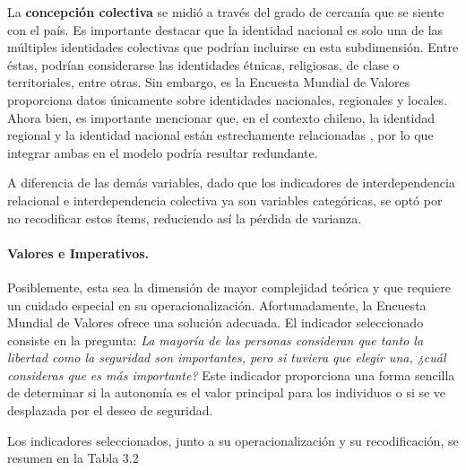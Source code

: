 \documentclass[12pt,twoside]{templates/facsothesis}
\begin{document}
La \textbf{concepción colectiva} se midió a través del grado de cercanía que se siente con el país. Es importante destacar que la identidad nacional es solo una de las múltiples identidades colectivas que podrían incluirse en esta subdimensión. Entre éstas, podrían considerarse las identidades étnicas, religiosas, de clase o territoriales, entre otras. Sin embargo, es la Encuesta Mundial de Valores proporciona datos únicamente sobre identidades nacionales, regionales y locales. Ahora bien, es importante mencionar que, en el contexto chileno, la identidad regional y la identidad nacional están estrechamente relacionadas \citep{zuniga2010}, por lo que integrar ambas en el modelo podría resultar redundante.

A diferencia de las demás variables, dado que los indicadores de interdependencia relacional e interdependencia colectiva ya son variables categóricas, se optó por no recodificar estos ítems, reduciendo así la pérdida de varianza.

\hypertarget{valores-e-imperativos.}{%
\paragraph*{Valores e Imperativos.}\label{valores-e-imperativos.}}

Posiblemente, esta sea la dimensión de mayor complejidad teórica y que requiere un cuidado especial en su operacionalización. Afortunadamente, la Encuesta Mundial de Valores ofrece una solución adecuada. El indicador seleccionado consiste en la pregunta: \emph{La mayoría de las personas consideran que tanto la libertad como la seguridad son importantes, pero si tuviera que elegir una, ¿cuál consideras que es más importante?} Este indicador proporciona una forma sencilla de determinar si la autonomía es el valor principal para los individuos o si se ve desplazada por el deseo de seguridad.

Los indicadores seleccionados, junto a su operacionalización y su recodificación, se resumen en la Tabla 3.2
\end{document}

